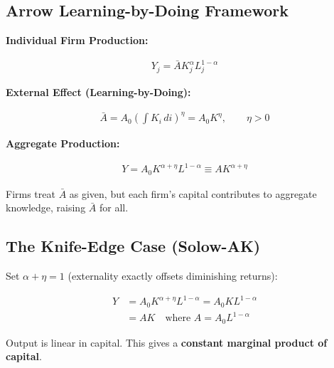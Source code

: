 
\subsection*{Arrow Learning-by-Doing Framework}

\medskip
\noindent\textbf{Individual Firm Production:}

\begin{align*}
Y_j = \bar{A} K_j^\alpha L_j^{1-\alpha} \tag{Firm Production}
\end{align*}

\medskip
\noindent\textbf{External Effect (Learning-by-Doing):}

\begin{align*}
\bar{A} = A_0 \left(\int K_i \, di\right)^\eta = A_0 K^\eta, \qquad \eta > 0
\tag{Externality}
\end{align*}

\medskip
\noindent\textbf{Aggregate Production:}

\begin{align*}
Y = A_0 K^{\alpha+\eta} L^{1-\alpha} \equiv A K^{\alpha+\eta} \tag{Aggregate}
\end{align*}

\medskip
\begin{tcolorbox}[colback=blue!5,colframe=blue3,title=Key Insight]
Firms treat $\bar{A}$ as given, but each firm's capital contributes to aggregate knowledge, raising $\bar{A}$ for all.
\end{tcolorbox}

\clearpage

\subsection*{The Knife-Edge Case (Solow-AK)}

\begin{derivationbox}
Set $\alpha + \eta = 1$ (externality exactly offsets diminishing returns):

\begin{align*}
Y &= A_0 K^{\alpha+\eta} L^{1-\alpha} = A_0 K L^{1-\alpha} \\
  &= A K \quad \text{where } A = A_0 L^{1-\alpha}
\end{align*}

\medskip
Output is linear in capital. This gives a \textbf{constant marginal product of capital}.
\end{derivationbox}

